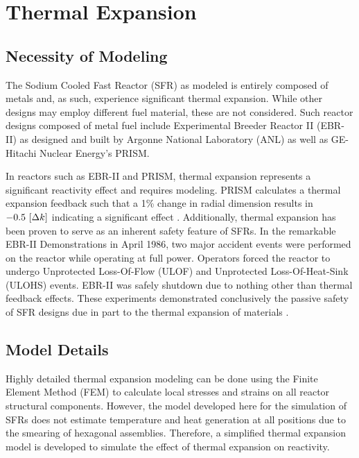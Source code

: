 \chapter{Thermal Expansion}
\label{ch:thermalExpansion}

\section{Necessity of Modeling}
  The Sodium Cooled Fast Reactor (SFR) as modeled is entirely composed of
  metals and, as such, experience significant thermal expansion. While other 
  designs may employ different fuel material, these are not considered. Such
  reactor designs composed of metal fuel include Experimental Breeder Reactor II
  (EBR-II) as designed and built by Argonne National Laboratory (ANL) as well as
  GE-Hitachi Nuclear Energy's PRISM. 

  In reactors such as EBR-II and PRISM, thermal expansion represents a
  significant reactivity effect and requires modeling. PRISM calculates a 
  thermal expansion feedback such that a 1\% change in radial dimension results
  in $-0.5 \,\left[\text{{$\Delta k$}}\right]$ indicating a significant effect \cite{GEFR793}.
  Additionally, thermal expansion has been proven to serve as an inherent safety 
  feature of SFRs. In the remarkable EBR-II Demonstrations in April 1986, two 
  major accident events were performed on the reactor while operating at full 
  power. Operators forced the reactor to undergo Unprotected Loss-Of-Flow (ULOF)
  and Unprotected Loss-Of-Heat-Sink (ULOHS) events. EBR-II was safely shutdown
  due to nothing other than thermal feedback effects. These experiments 
  demonstrated conclusively the passive safety of SFR designs due in part to the
  thermal expansion of materials \cite{PlentifulEnergy}.

\section{Model Details}
  \label{sec:model_details}
  Highly detailed thermal expansion modeling can be done using the Finite
  Element Method (FEM) to calculate local stresses and strains on all reactor
  structural components. However, the model developed here for the simulation of
  SFRs does not estimate temperature and heat generation at all positions due to
  the smearing of hexagonal assemblies. Therefore, a simplified thermal
  expansion model is developed to simulate the effect of thermal expansion on
  reactivity.

